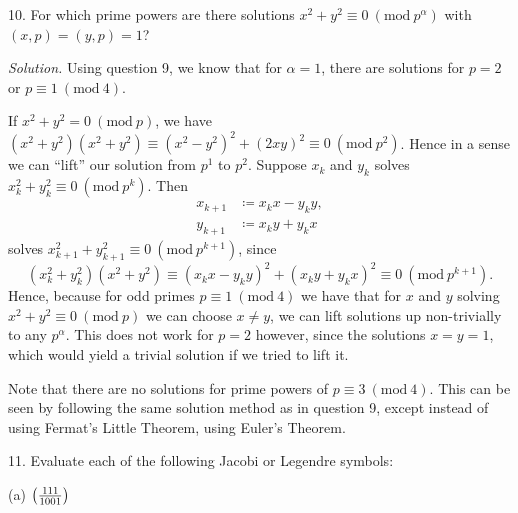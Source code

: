 \documentclass{article}
\newcommand{\Mod}[1]{\ (\mathrm{mod}\ #1)}
\newcommand{\Leg}[2]{\del{\frac{#1}{#2}}}
\begin{document}
10. For which prime powers are there solutions $x^2 + y^2 \equiv 0 \Mod{p^\alpha}$
with $(x, p) = (y, p) = 1$?

\textit{Solution.}
Using question 9, we know that for $\alpha = 1$, there are solutions for $p = 2$
or $p \equiv 1 \Mod{4}$.

If $x^2 + y^2 = 0 \Mod{p}$,
we have $(x^2 + y^2)(x^2 + y^2) \equiv (x^2 - y^2)^2 + (2xy)^2 \equiv 0 \Mod{p^2}$.
Hence in a sense we can ``lift'' our solution from $p^1$ to $p^2$. Suppose
$x_k$ and $y_k$ solves $x_k^2 + y_k^2 \equiv 0 \Mod{p^k}$. Then
%
\begin{align*}
    x_{k + 1} &\coloneqq x_k x - y_k y, \\
    y_{k + 1} &\coloneqq x_k y + y_k x
\end{align*}
%
solves $x_{k + 1}^2 + y_{k + 1}^2 \equiv 0 \Mod{p^{k + 1}}$, since
%
\begin{equation*}
    (x_k^2 + y_k^2) (x^2 + y^2) \equiv (x_kx - y_k y)^2 + (x_k y + y_k x)^2 \equiv 0 \Mod{p^{k + 1}}
    .
\end{equation*}
%
Hence, because for odd primes $p \equiv 1 \Mod{4}$ we have that for $x$ and $y$ solving
$x^2 + y^2 \equiv 0 \Mod{p}$ we can choose $x \neq y$, we can lift solutions up
non-trivially to any $p^\alpha$. This does not work for $p = 2$ however,
since the solutions $x = y = 1$, which would yield a trivial solution if we tried
to lift it.

Note that there are no solutions for prime powers of $p \equiv 3 \Mod{4}$.
This can be seen by following the same solution method as in question 9,
except instead of using Fermat's Little Theorem, using Euler's Theorem.

\newpage

11. Evaluate each of the following Jacobi or Legendre symbols:

(a) $\Leg{111}{1001}$
\end{document}
